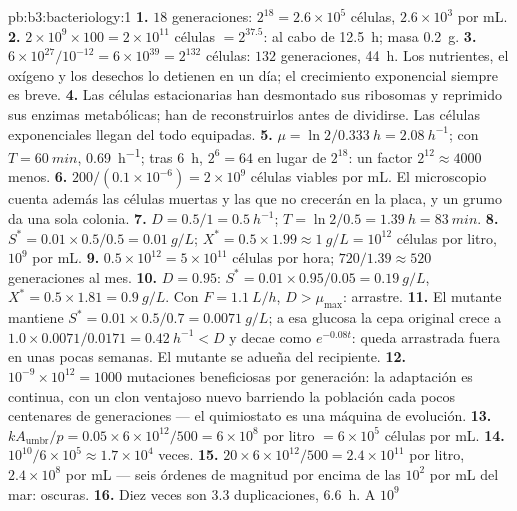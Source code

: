 \begin{solution}{pb:b3:bacteriology:1}
\textbf{1.} $18$ generaciones: $2^{18} = 2.6\times 10^{5}$ células,
$2.6\times 10^{3}$ por mL.
\textbf{2.} $2\times 10^{9}\times 100 = 2\times 10^{11}$ células $=
2^{37.5}$: al cabo de \qty{12.5}{h}; masa \qty{0.2}{g}.
\textbf{3.} $6\times 10^{27}/10^{-12} = 6\times 10^{39} = 2^{132}$
células: $132$ generaciones, \qty{44}{h}. Los nutrientes, el oxígeno y
los desechos lo detienen en un día; el crecimiento exponencial siempre es
breve.
\textbf{4.} Las células estacionarias han desmontado sus ribosomas y
reprimido sus enzimas metabólicas; han de reconstruirlos antes de
dividirse. Las células exponenciales llegan del todo equipadas.
\textbf{5.} $\mu = \ln 2/\qty{0.333}{h} = \qty{2.08}{h^{-1}}$; con $T =
\qty{60}{min}$, \qty{0.69}{h^{-1}}; tras \qty{6}{h}, $2^{6} = 64$ en
lugar de $2^{18}$: un factor $2^{12} \approx 4000$ menos.
\textbf{6.} $200/(0.1\times 10^{-6}) = 2\times 10^{9}$ células viables
por mL. El microscopio cuenta además las células muertas y las que no
crecerán en la placa, y un grumo da una sola colonia.
\textbf{7.} $D = 0.5/1 = \qty{0.5}{h^{-1}}$; $T = \ln 2/0.5 =
\qty{1.39}{h} = \qty{83}{min}$.
\textbf{8.} $S^{*} = 0.01\times 0.5/0.5 = \qty{0.01}{g/L}$; $X^{*} =
0.5\times 1.99 \approx \qty{1}{g/L} = 10^{12}$ células por litro,
$10^{9}$ por mL.
\textbf{9.} $0.5\times 10^{12} = 5\times 10^{11}$ células por hora; $720/1.39
\approx 520$ generaciones al mes.
\textbf{10.} $D = 0.95$: $S^{*} = 0.01\times 0.95/0.05 = \qty{0.19}{g/L}$,
$X^{*} = 0.5\times 1.81 = \qty{0.9}{g/L}$. Con $F = \qty{1.1}{L/h}$, $D
> \mu_{\max}$: arrastre.
\textbf{11.} El mutante mantiene $S^{*} = 0.01\times 0.5/0.7 = \qty{0.0071}{g/L}$;
a esa glucosa la cepa original crece a $1.0\times 0.0071/0.0171 =
\qty{0.42}{h^{-1}} < D$ y decae como $e^{-0.08t}$: queda arrastrada fuera
en unas pocas semanas. El mutante se adueña del recipiente.
\textbf{12.} $10^{-9}\times 10^{12} = 1000$ mutaciones beneficiosas por
generación: la adaptación es continua, con un clon ventajoso nuevo
barriendo la población cada pocos centenares de generaciones --- el
quimiostato es una máquina de evolución.
\textbf{13.} $kA_{\text{umbr}}/p = 0.05\times 6\times 10^{12}/500 =
6\times 10^{8}$ por litro $= 6\times 10^{5}$ células por mL.
\textbf{14.} $10^{10}/6\times 10^{5} \approx 1.7\times 10^{4}$ veces.
\textbf{15.} $20\times 6\times 10^{12}/500 = 2.4\times 10^{11}$ por litro,
$2.4\times 10^{8}$ por mL --- seis órdenes de magnitud por encima de las
$10^{2}$ por mL del mar: oscuras.
\textbf{16.} Diez veces son $3.3$ duplicaciones, \qty{6.6}{h}. A $10^{9}$

\end{solution}
